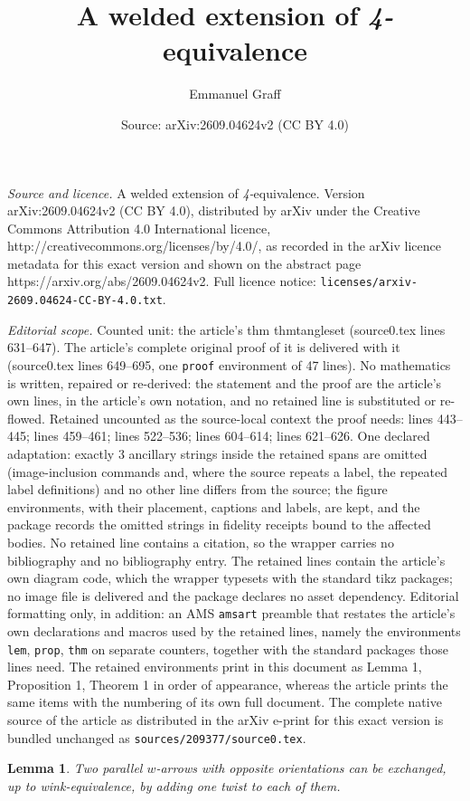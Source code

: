 \documentclass[10pt,a4paper]{amsart}
\title{A welded extension of \textit{4-}equivalence}
\author{Emmanuel Graff}
\date{Source: arXiv:2609.04624v2 (CC BY 4.0)}
\newtheorem{lem}{Lemma}
\begin{document}
\maketitle

\noindent\emph{Source and licence.} A welded extension of \textit{4-}equivalence. Version arXiv:2609.04624v2 (CC BY 4.0), distributed by arXiv under the Creative Commons Attribution 4.0 International licence, http://creativecommons.org/licenses/by/4.0/, as recorded in the arXiv licence metadata for this exact version and shown on the abstract page https://arxiv.org/abs/2609.04624v2. Full licence notice: \texttt{licenses/arxiv-2609.04624-CC-BY-4.0.txt}.\par\smallskip

\noindent\textit{Editorial scope.} Counted unit: the article's thm thmtangleset (source0.tex lines 631--647). The article's complete original proof of it is delivered with it (source0.tex lines 649--695, one \texttt{proof} environment of 47 lines). No mathematics is written, repaired or re-derived: the statement and the proof are the article's own lines, in the article's own notation, and no retained line is substituted or re-flowed.  Retained uncounted as the source-local context the proof needs: lines 443--445; lines 459--461; lines 522--536; lines 604--614; lines 621--626.  One declared adaptation: exactly 3 ancillary strings inside the retained spans are omitted (image-inclusion commands and, where the source repeats a label, the repeated label definitions) and no other line differs from the source; the figure environments, with their placement, captions and labels, are kept, and the package records the omitted strings in fidelity receipts bound to the affected bodies.  No retained line contains a citation, so the wrapper carries no bibliography and no bibliography entry.  The retained lines contain the article's own diagram code, which the wrapper typesets with the standard tikz packages; no image file is delivered and the package declares no asset dependency.  Editorial formatting only, in addition: an AMS \texttt{amsart} preamble that restates the article's own declarations and macros used by the retained lines, namely the environments \texttt{lem}, \texttt{prop}, \texttt{thm} on separate counters, together with the standard packages those lines need.  The retained environments print in this document as Lemma 1, Proposition 1, Theorem 1 in order of appearance, whereas the article prints the same items with the numbering of its own full document.  The complete native source of the article as distributed in the arXiv e-print for this exact version is bundled unchanged as \texttt{sources/209377/source0.tex}.
\begin{lem}\label{lemarrowcommu}
Two parallel $w$-arrows with opposite orientations can be exchanged, up to wink-equivalence, by adding one twist to each of them.
\end{lem}
\end{document}
